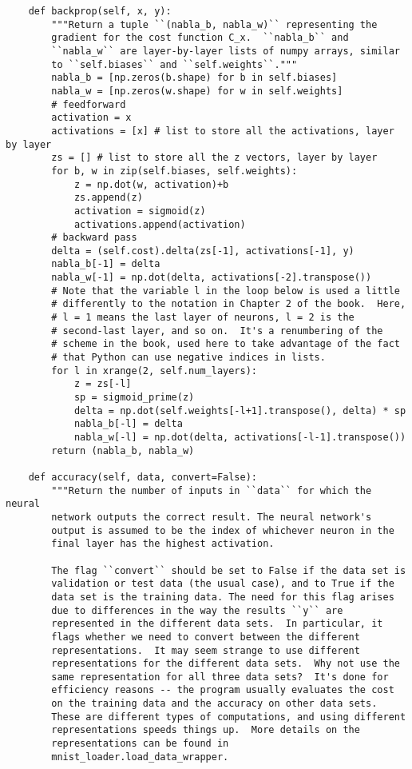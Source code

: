 \begin{lstlisting}
    def backprop(self, x, y):
        """Return a tuple ``(nabla_b, nabla_w)`` representing the
        gradient for the cost function C_x.  ``nabla_b`` and
        ``nabla_w`` are layer-by-layer lists of numpy arrays, similar
        to ``self.biases`` and ``self.weights``."""
        nabla_b = [np.zeros(b.shape) for b in self.biases]
        nabla_w = [np.zeros(w.shape) for w in self.weights]
        # feedforward
        activation = x
        activations = [x] # list to store all the activations, layer by layer
        zs = [] # list to store all the z vectors, layer by layer
        for b, w in zip(self.biases, self.weights):
            z = np.dot(w, activation)+b
            zs.append(z)
            activation = sigmoid(z)
            activations.append(activation)
        # backward pass
        delta = (self.cost).delta(zs[-1], activations[-1], y)
        nabla_b[-1] = delta
        nabla_w[-1] = np.dot(delta, activations[-2].transpose())
        # Note that the variable l in the loop below is used a little
        # differently to the notation in Chapter 2 of the book.  Here,
        # l = 1 means the last layer of neurons, l = 2 is the
        # second-last layer, and so on.  It's a renumbering of the
        # scheme in the book, used here to take advantage of the fact
        # that Python can use negative indices in lists.
        for l in xrange(2, self.num_layers):
            z = zs[-l]
            sp = sigmoid_prime(z)
            delta = np.dot(self.weights[-l+1].transpose(), delta) * sp
            nabla_b[-l] = delta
            nabla_w[-l] = np.dot(delta, activations[-l-1].transpose())
        return (nabla_b, nabla_w)

    def accuracy(self, data, convert=False):
        """Return the number of inputs in ``data`` for which the neural
        network outputs the correct result. The neural network's
        output is assumed to be the index of whichever neuron in the
        final layer has the highest activation.

        The flag ``convert`` should be set to False if the data set is
        validation or test data (the usual case), and to True if the
        data set is the training data. The need for this flag arises
        due to differences in the way the results ``y`` are
        represented in the different data sets.  In particular, it
        flags whether we need to convert between the different
        representations.  It may seem strange to use different
        representations for the different data sets.  Why not use the
        same representation for all three data sets?  It's done for
        efficiency reasons -- the program usually evaluates the cost
        on the training data and the accuracy on other data sets.
        These are different types of computations, and using different
        representations speeds things up.  More details on the
        representations can be found in
        mnist_loader.load_data_wrapper.


\end{lstlisting}
